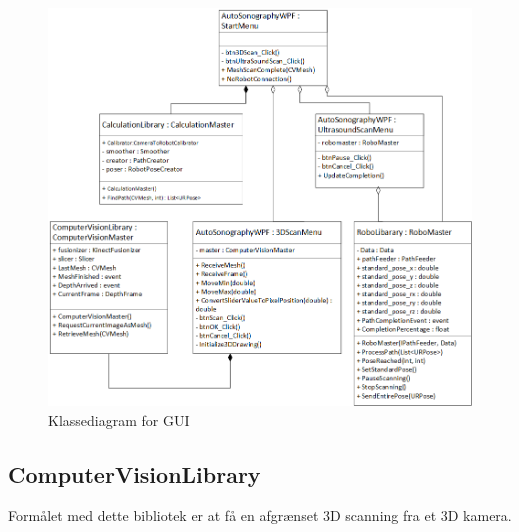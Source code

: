\begin{figure}[H]
    \centering
    \includegraphics[width=1\textwidth]{figurer/d/Design/Class/uml_class_gui}
    \caption{Klassediagram for GUI}
    \label{class_gui}
\end{figure}
\newpage

\subsection{ComputerVisionLibrary}
Formålet med dette bibliotek er at få en afgrænset 3D scanning fra et 3D kamera.

